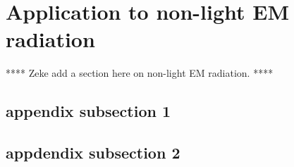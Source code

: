 
\section{Application to non-light EM radiation}
\label{sec:non_light}
  
**** Zeke add a section here on non-light EM radiation. ****





\subsection{appendix subsection 1}
\label{sec:appendix_subsection_1}
  


\subsection{appdendix subsection 2}
\label{sec:appendix_subsection_2}
  
